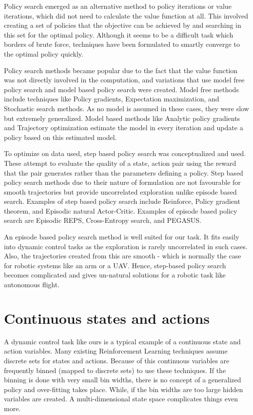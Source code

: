 \documentclass[BTech]{iitmdiss}
\begin{document}
Policy search emerged as an alternative method to policy iterations or value iterations, which did not need to calculate the value function at all. This involved creating a set of policies that the objective can be achieved by and searching in this set for the optimal policy. Although it seems to be a difficult task which borders of brute force, techniques have been formulated to smartly converge to the optimal policy quickly.

Policy search methods became popular due to the fact that the value function was not directly involved in the computation, and variations that use model free policy search and model based policy search were created. Model free methods include techniques like Policy gradients, Expectation maximization, and Stochastic search methods. As no model is assumed in these cases, they were slow but extremely generalized. Model based methods like Analytic policy gradients and Trajectory optimization estimate the model in every iteration and update a policy based on this estimated model.

To optimize on data used, step based policy search was conceptualized and used. These attempt to evaluate the quality of a state, action pair using the reward that the pair generates rather than the parameters defining a policy. Step based policy search methods due to their nature of formulation are not favourable for smooth trajectories but provide uncorrelated exploration unlike episode based search. Examples of step based policy search include Reinforce, Policy gradient theorem, and Episodic natural Actor-Critic. Examples of episode based policy search are Episodic REPS, Cross-Entropy search, and PEGASUS.

An episode based policy search method is well suited for our task. It fits easily into dynamic control tasks as the exploration is rarely uncorrelated in such cases. Also, the trajectories created from this are smooth - which is normally the case for robotic systems like an arm or a UAV. Hence, step-based policy search becomes complicated and gives un-natural solutions for a robotic task like autonomous flight.

\section{Continuous states and actions}

A dynamic control task like ours is a typical example of a continuous state and action variables. Many existing Reinforcement Learning techniques assume discrete sets for states and actions. Because of this continuous variables are frequently binned (mapped to discrete sets) to use these techniques. If the binning is done with very small bin widths, there is no concept of a generalized policy and over-fitting takes place. While, if the bin widths are too large hidden variables are created. A multi-dimensional state space complicates things even more.
\end{document}
